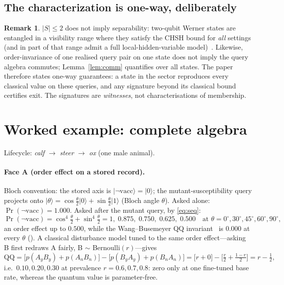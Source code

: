 \documentclass[11pt]{article}
\newcommand{\ket}[1]{\lvert #1 \rangle}
\theoremstyle{definition}
\newtheorem{qrem}{Remark}
\begin{document}
\subsection{The characterization is one-way, deliberately}
\begin{qrem}\label{rem:werner}
$\lvert S\rvert\le2$ does not imply separability: two-qubit Werner states are entangled in a visibility range where they satisfy the CHSH bound for \emph{all} settings (and in part of that range admit a full local-hidden-variable model)~\cite{werner1989}. Likewise, order-invariance of one realised query pair on one state does not imply the query algebra commutes; Lemma~\ref{lem:comm} quantifies over all states. The paper therefore states one-way guarantees: a state in the sector reproduces every classical value on these queries, and any signature beyond its classical bound certifies exit. The signatures are \emph{witnesses}, not characterisations of membership.
\end{qrem}

\section{Worked example: complete algebra}
Lifecycle: \emph{calf} $\to$ \emph{steer} $\to$ \emph{ox} (one male animal).

\paragraph{Face A (order effect on a stored record).}
Bloch convention: the stored axis is $\ket{\lnot\text{vacc}}=\ket0$; the mutant-susceptibility query projects onto $\ket{\theta}=\cos\tfrac\theta2\ket0+\sin\tfrac\theta2\ket1$ (Bloch angle $\theta$). Asked alone: $\Pr(\lnot\text{vacc})=1.000$. Asked after the mutant query, by \eqref{eq:seq}:
\[
\Pr(\lnot\text{vacc})=\cos^4\tfrac\theta2+\sin^4\tfrac\theta2
=1,\;0.875,\;0.750,\;0.625,\;0.500
\quad\text{at }\theta=0^\circ,30^\circ,45^\circ,60^\circ,90^\circ,
\]
an order effect up to $0.500$, while the Wang--Busemeyer QQ invariant~\cite{wangbusemeyer2013} is $0.000$ at every $\theta$ (). A classical disturbance model tuned to the same order effect---asking B first redraws A fairly, B $\sim$ Bernoulli$(r)$---gives
\[
\mathrm{QQ}=\big[p(A_yB_y)+p(A_nB_n)\big]-\big[p(B_yA_y)+p(B_nA_n)\big]
=\big[r+0\big]-\big[\tfrac r2+\tfrac{1-r}2\big]=r-\tfrac12,
\]
i.e.\ $0.10,0.20,0.30$ at prevalence $r=0.6,0.7,0.8$: zero only at one fine-tuned base rate, whereas the quantum value is parameter-free.
\end{document}
